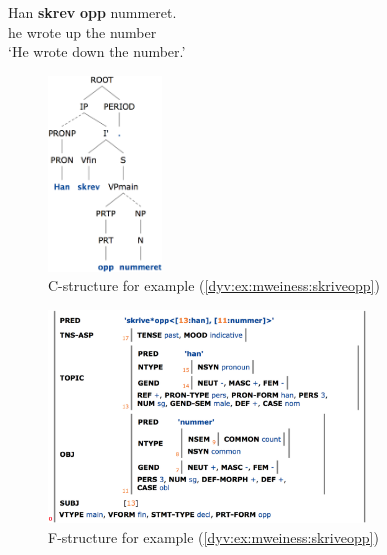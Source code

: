 \documentclass[output=paper]{langsci/langscibook}
\begin{document}
\ea\label{dyv:ex:mweiness:skriveopp}
\gll Han \textbf{skrev} \textbf{opp} nummeret. \\
     he wrote up {the number}\\
\glt `He wrote down the number.'
\z


\begin{figure}
  \includegraphics[width=0.27\textwidth]{figures/particlecons-c.png}
  \caption{C-structure for example (\ref{dyv:ex:mweiness:skriveopp})}
  \label{dyv:fig:mweiness:particlecons-c}
\end{figure}

\begin{figure}
  \includegraphics[width=0.75\textwidth]{figures/particlecons-f.png}
  \caption{F-structure for example (\ref{dyv:ex:mweiness:skriveopp})}
  \label{dyv:fig:mweiness:particlecons-f}
\end{figure}

\end{document}
